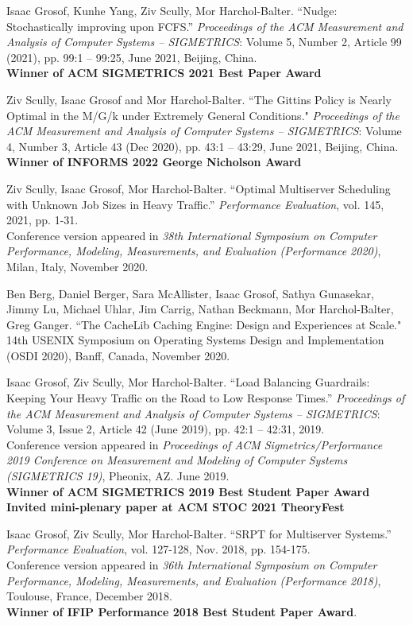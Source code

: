 \documentclass{res}
\begin{document}
\begin{resume}
    Isaac Grosof, Kunhe Yang, Ziv Scully, Mor Harchol-Balter.
    ``Nudge: Stochastically improving upon FCFS.''
    \textit{Proceedings of the ACM Measurement and Analysis of Computer Systems -- SIGMETRICS}: Volume 5, Number 2, Article 99 (2021), pp. 99:1 -- 99:25, June 2021, Beijing, China.\\
    \textbf{Winner of ACM SIGMETRICS 2021 Best Paper Award}

    Ziv Scully, Isaac Grosof and Mor Harchol-Balter.
    ``The Gittins Policy is Nearly Optimal in the M/G/k under Extremely General Conditions."
    \textit{Proceedings of the ACM Measurement and Analysis of Computer Systems -- SIGMETRICS}: Volume 4, Number 3, Article 43 (Dec 2020), pp. 43:1 -- 43:29, June 2021, Beijing, China. \\
    \textbf{Winner of INFORMS 2022 George Nicholson Award}

    Ziv Scully, Isaac Grosof, Mor Harchol-Balter.
    ``Optimal Multiserver Scheduling with Unknown Job Sizes in Heavy Traffic.''
    \textit{Performance Evaluation}, vol. 145, 2021, pp. 1-31. \\
    Conference version appeared in
    \textit{38th International Symposium on Computer Performance, Modeling, Measurements, and Evaluation (Performance 2020)},
    Milan, Italy, November 2020.

	Ben Berg, Daniel Berger, Sara McAllister, Isaac Grosof, Sathya Gunasekar, Jimmy Lu, Michael Uhlar,
	Jim Carrig, Nathan Beckmann, Mor Harchol-Balter, Greg Ganger.
	``The CacheLib Caching Engine: Design and Experiences at Scale."
	14th USENIX Symposium on Operating Systems Design and Implementation (OSDI 2020),
	Banff, Canada, November 2020.

    Isaac Grosof, Ziv Scully, Mor Harchol-Balter.
    ``Load Balancing Guardrails: Keeping Your Heavy Traffic on the Road to Low Response Times.''
    \textit{Proceedings of the ACM Measurement and Analysis of Computer Systems -- SIGMETRICS}:
    Volume 3, Issue 2, Article 42 (June 2019), pp. 42:1 -- 42:31, 2019. \\
    Conference version appeared in \textit{Proceedings of ACM Sigmetrics/Performance 2019
    Conference on Measurement and Modeling of Computer Systems (SIGMETRICS 19)}, Pheonix, AZ.
    June 2019.\\
    \textbf{Winner of ACM SIGMETRICS 2019 Best Student Paper Award} \\
    \textbf{Invited mini-plenary paper at ACM STOC 2021 TheoryFest}

    Isaac Grosof, Ziv Scully, Mor Harchol-Balter.
    ``SRPT for Multiserver Systems.''
    \textit{Performance Evaluation}, vol. 127-128, Nov. 2018, pp. 154-175. \\
    Conference version appeared in \textit{36th International Symposium on Computer Performance, Modeling, Measurements, and Evaluation (Performance 2018)}, Toulouse, France, December 2018. \\
    \textbf{Winner of IFIP Performance 2018 Best Student Paper Award}.


\end{resume}
\end{document}

